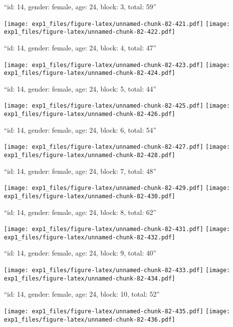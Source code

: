 \documentclass[11pt,,]{article}
\begin{document}
\newpage
[1] 

``id: 14, gender: female, age: 24, block: 3, total: 59''

\texttt{[image: exp1\_files/figure-latex/unnamed-chunk-82-421.pdf]}
\texttt{[image: exp1\_files/figure-latex/unnamed-chunk-82-422.pdf]}

\newpage
[1] 

``id: 14, gender: female, age: 24, block: 4, total: 47''

\texttt{[image: exp1\_files/figure-latex/unnamed-chunk-82-423.pdf]}
\texttt{[image: exp1\_files/figure-latex/unnamed-chunk-82-424.pdf]}

\newpage
[1] 

``id: 14, gender: female, age: 24, block: 5, total: 44''

\texttt{[image: exp1\_files/figure-latex/unnamed-chunk-82-425.pdf]}
\texttt{[image: exp1\_files/figure-latex/unnamed-chunk-82-426.pdf]}

\newpage
[1] 

``id: 14, gender: female, age: 24, block: 6, total: 54''

\texttt{[image: exp1\_files/figure-latex/unnamed-chunk-82-427.pdf]}
\texttt{[image: exp1\_files/figure-latex/unnamed-chunk-82-428.pdf]}

\newpage
[1] 

``id: 14, gender: female, age: 24, block: 7, total: 48''

\texttt{[image: exp1\_files/figure-latex/unnamed-chunk-82-429.pdf]}
\texttt{[image: exp1\_files/figure-latex/unnamed-chunk-82-430.pdf]}

\newpage
[1] 

``id: 14, gender: female, age: 24, block: 8, total: 62''

\texttt{[image: exp1\_files/figure-latex/unnamed-chunk-82-431.pdf]}
\texttt{[image: exp1\_files/figure-latex/unnamed-chunk-82-432.pdf]}

\newpage
[1] 

``id: 14, gender: female, age: 24, block: 9, total: 40''

\texttt{[image: exp1\_files/figure-latex/unnamed-chunk-82-433.pdf]}
\texttt{[image: exp1\_files/figure-latex/unnamed-chunk-82-434.pdf]}

\newpage
[1] 

``id: 14, gender: female, age: 24, block: 10, total: 52''

\texttt{[image: exp1\_files/figure-latex/unnamed-chunk-82-435.pdf]}
\texttt{[image: exp1\_files/figure-latex/unnamed-chunk-82-436.pdf]}
\end{document}
